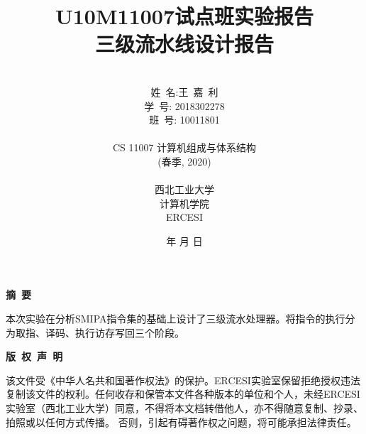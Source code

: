 \documentclass[UTF8]{ctexart}
\begin{document}
\renewcommand{\contentsname}{目\ 录}
\renewcommand{\appendixname}{附录}
\renewcommand{\refname}{参考文献} 
\renewcommand{\figurename}{图}
\renewcommand{\tablename}{表}
\renewcommand{\today}{\number\year 年 \number\month 月 \number\day 日}

\title{{\Huge U10M11007试点班实验报告{\large\linebreak\\}}{\Large 三级流水线设计报告\linebreak\linebreak}}
\author{\\姓\ 名:王\ 嘉\ 利\\
学\ 号: 2018302278\\
班\ 号: 10011801\\\\
CS 11007 计算机组成与体系结构\\
(春季, 2020)\\\\
西北工业大学\\
计算机学院\\
ERCESI}
\date{\today}
\maketitle
\newpage

\begin{center}
{\Large\bf{摘\ 要\\}}
\end{center}
本次实验在分析SMIPA指令集的基础上设计了三级流水处理器。将指令的执行分为取指、译码、执行访存写回三个阶段。
\newpage
\begin{center}
{\Large\bf{版\ 权\ 声\ 明\\}}
\end{center}
该文件受《中华人名共和国著作权法》的保护。ERCESI实验室保留拒绝授权违法复制该文件的权利。任何收存和保管本文件各种版本的单位和个人，未经ERCESI实验室（西北工业大学）同意，不得将本文档转借他人，亦不得随意复制、抄录、拍照或以任何方式传播。 否则，引起有碍著作权之问题，将可能承担法律责任。\newpage
\begin{center}
\tableofcontents\label{c}
\end{center}
\newpage
\end{document}
